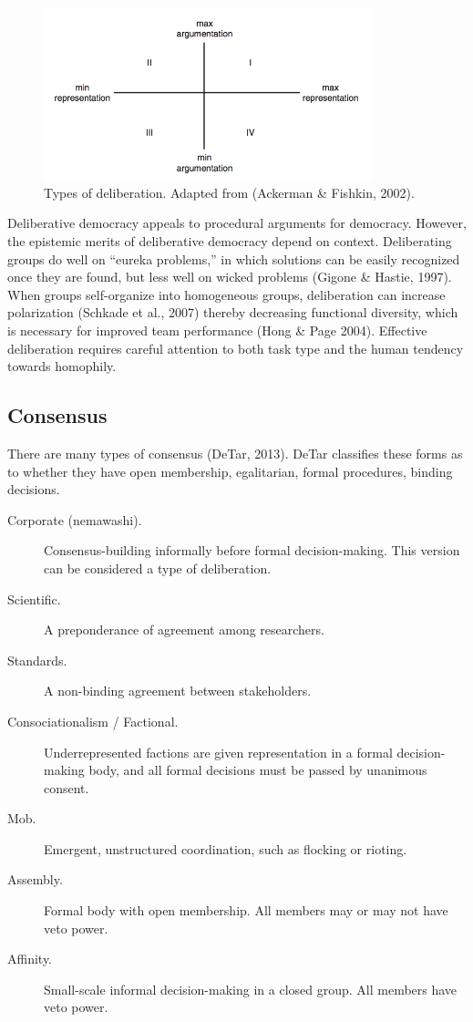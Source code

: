 \begin{figure}
\centering
\includegraphics[width=3.75in]{images/fig-deliberation.png}
\caption{Types of deliberation. Adapted from (Ackerman \& Fishkin, 2002).\label{fig:deliberation}}
\end{figure}

Deliberative democracy appeals to procedural arguments for democracy. However, the epistemic merits of deliberative democracy depend on context. Deliberating groups do well on ``eureka problems,'' in which solutions can be easily recognized once they are found, but less well on wicked problems (Gigone \& Hastie, 1997). When groups self-organize into homogeneous groups, deliberation can increase polarization (Schkade et al., 2007) thereby decreasing functional diversity, which is necessary for improved team performance (Hong \& Page 2004). Effective deliberation requires careful attention to both task type and the human tendency towards homophily.

\subsection{Consensus}
There are many types of consensus (DeTar, 2013). DeTar classifies these forms as to whether they have open membership, egalitarian, formal procedures, binding decisions.

\begin{description}
\item[Corporate (nemawashi).]{Consensus-building informally before formal decision-making. This version can be considered a type of deliberation.}
\item[Scientific.]{A preponderance of agreement among researchers.}
\item[Standards.]{A non-binding agreement between stakeholders.}
\item[Consociationalism / Factional.]{Underrepresented factions are given representation in a formal decision-making body, and all formal decisions must be passed by unanimous consent.}
\item[Mob.]{Emergent, unstructured coordination, such as flocking or rioting.}
\item[Assembly.]{Formal body with open membership. All members may or may not have veto power.}
\item[Affinity.]{Small-scale informal decision-making in a closed group. All members have veto power.}
\end{description}

